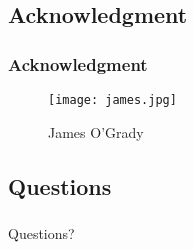\subsection{Acknowledgment}
\begin{frame}
  \frametitle{Acknowledgment}
  \vfill
  \begin{figure}
      \texttt{[image: james.jpg]}
      \caption{James O'Grady}
  \end{figure}
\end{frame}
%

\subsection{Questions}
\begin{frame}
  \frametitle{}
  \vfill
  \begin{center}
      Questions?
  \end{center}
\end{frame}
%

\setcounter{finalframe}{\value{framenumber}}

\setcounter{framenumber}{\value{finalframe}}
%

